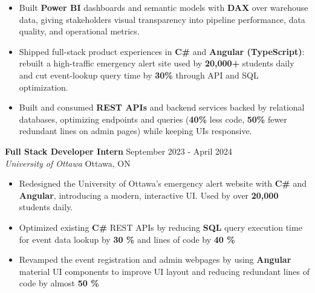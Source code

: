 \documentclass[a4paper]{article}
\begin{document}
\begin{itemize}
\item Built \textbf{Power BI} dashboards and semantic models with \textbf{DAX} over warehouse data, giving stakeholders visual transparency into pipeline performance, data quality, and operational metrics.

\item Shipped full-stack product experiences in \textbf{C\#} and \textbf{Angular (TypeScript)}: rebuilt a high-traffic emergency alert site used by \textbf{20,000+} students daily and cut event-lookup query time by \textbf{30\%} through API and SQL optimization.

\item Built and consumed \textbf{REST APIs} and backend services backed by relational databases, optimizing endpoints and queries (\textbf{40\%} less code, \textbf{50\%} fewer redundant lines on admin pages) while keeping UIs responsive.

\end{itemize}

\textbf{Full Stack Developer Intern } \hfill September 2023 - April 2024\\
\textit{University of Ottawa} \hfill Ottawa, ON\\
\vspace{-2mm}
\begin{itemize} \itemsep -4pt \topsep 0pt
    \item Redesigned the University of Ottawa's emergency alert website with \textbf{C\#} and \textbf{Angular}, introducing a modern, interactive UI. Used by over \textbf{20,000} students daily.
     \item Optimized existing \textbf{C\#} REST APIs by reducing \textbf{SQL} query execution time for event data lookup by \textbf{30 \%} and lines of code by \textbf{40 \%}
    \item Revamped the event registration and admin webpages by using \textbf{Angular} material UI components to improve UI layout and reducing redundant lines of code by almost \textbf{50 \%}
\end{itemize}
\end{document}
